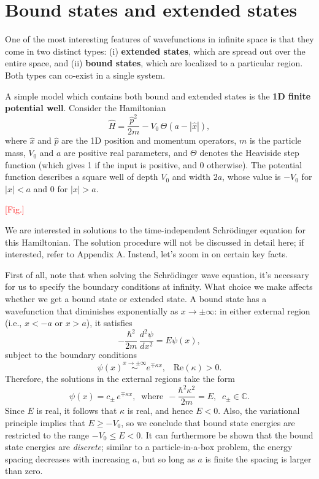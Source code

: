 \documentclass[pra,11pt]{revtex4}
\begin{document}
\section{Bound states and extended states}

One of the most interesting features of wavefunctions in infinite
space is that they come in two distinct types: (i) \textbf{extended
  states}, which are spread out over the entire space, and (ii)
\textbf{bound states}, which are localized to a particular region.
Both types can co-exist in a single system.

A simple model which contains both bound and extended states is the
\textbf{1D finite potential well}.  Consider the Hamiltonian
$$\hat{H} = \frac{\hat{p}^2}{2m} - V_0 \,\Theta(a -|\hat{x}|),$$
where $\hat{x}$ and $\hat{p}$ are the 1D position and momentum
operators, $m$ is the particle mass, $V_0$ and $a$ are positive real
parameters, and $\Theta$ denotes the Heaviside step function (which
gives 1 if the input is positive, and 0 otherwise).  The potential
function describes a square well of depth $V_0$ and width $2a$, whose
value is $-V_0$ for $|x| < a$ and $0$ for $|x|>a$.

\textcolor{red}{[Fig.]}

We are interested in solutions to the time-independent Schr\"odinger
equation for this Hamiltonian.  The solution procedure will not be
discussed in detail here; if interested, refer to Appendix A.
Instead, let's zoom in on certain key facts.

First of all, note that when solving the Schr\"odinger wave equation,
it's necessary for us to specify the boundary conditions at infinity.
What choice we make affects whether we get a bound state or extended
state.  A bound state has a wavefunction that diminishes exponentially
as $x \rightarrow \pm\infty$: in either external region (i.e., $x <
-a$ or $x > a$), it satisfies
$$-\frac{\hbar^2}{2m}\,\frac{d^2\psi}{dx^2} = E \psi(x),$$
subject to the boundary conditions
$$\psi(x) \overset{x\rightarrow\pm\infty}{\sim} e^{\mp\kappa x}, \;\;\;\mathrm{Re}(\kappa) > 0.$$
Therefore, the solutions in the external regions take the form
$$\psi(x) = c_\pm\, e^{\mp\kappa x}, \;\;\mathrm{where}\;\, -\frac{\hbar^2\kappa^2}{2m} = E, \;\; c_\pm \in \mathbb{C}.$$
Since $E$ is real, it follows that $\kappa$ is real, and hence $E <
0$.  Also, the variational principle implies that $E \ge -V_0$, so we
conclude that bound state energies are restricted to the range $-V_0
\le E < 0$.  It can furthermore be shown that the bound state energies
are \textit{discrete}; similar to a particle-in-a-box problem, the
energy spacing decreases with increasing $a$, but so long as $a$ is
finite the spacing is larger than zero.
\end{document}
